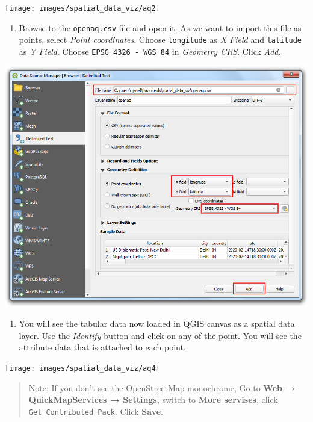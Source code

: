\documentclass[
  12pt,
  a4paper]{article}
\providecommand{\tightlist}{%
  \setlength{\itemsep}{0pt}\setlength{\parskip}{0pt}}
\begin{document}
\begin{center}\texttt{[image: images/spatial\_data\_viz/aq2]} \end{center}

\begin{enumerate}
\def\labelenumi{\arabic{enumi}.}
\setcounter{enumi}{2}
\tightlist
\item
  Browse to the \texttt{openaq.csv} file and open it. As we want to
  import this file as points, select \emph{Point coordinates}. Choose
  \texttt{longitude} as \emph{X Field} and \texttt{latitude} as \emph{Y
  Field}. Choose \texttt{EPSG\ 4326\ -\ WGS\ 84} in \emph{Geometry CRS}.
  Click \emph{Add}.
\end{enumerate}

\begin{center}\includegraphics[width=0.75\linewidth]{images/spatial_data_viz/aq3} \end{center}

\begin{enumerate}
\def\labelenumi{\arabic{enumi}.}
\setcounter{enumi}{3}
\tightlist
\item
  You will see the tabular data now loaded in QGIS canvas as a spatial
  data layer. Use the \emph{Identify} button and click on any of the
  point. You will see the attribute data that is attached to each point.
\end{enumerate}

\begin{center}\texttt{[image: images/spatial\_data\_viz/aq4]} \end{center}

\begin{quote}
Note: If you don't see the OpenStreetMap monochrome, Go to \textbf{Web →
QuickMapServices → Settings}, switch to \textbf{More servises}, click
\texttt{Get\ Contributed\ Pack}. Click \textbf{Save}.
\end{quote}
\end{document}
